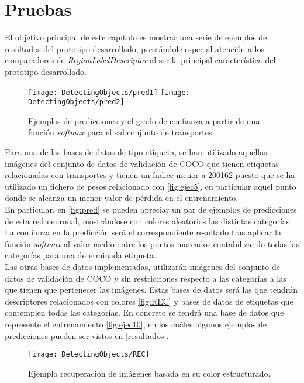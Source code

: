 \chapter{Pruebas}
El objetivo principal de este capítulo es mostrar una serie de ejemplos de resultados del prototipo desarrollado, prestándole especial atención a los comparadores de \emph{RegionLabelDescriptor} al ser la principal característica del prototipo desarrollado.\\

\begin{figure}[htpb]
  \centering
  \texttt{[image: DetectingObjects/pred1]}
  \texttt{[image: DetectingObjects/pred2]}
  \caption{Ejemplos de predicciones y el grado de confianza a partir de una función \emph{softmax} para el subconjunto de transportes.}
  \label{fig:pred}
\end{figure}

Para una de las bases de datos de tipo etiqueta, se han utilizado aquellas imágenes del conjunto de datos de validación de COCO \cite{COCO} que tienen etiquetas relacionadas con transportes y tienen un índice menor a 200162 puesto que se ha utilizado un fichero de pesos relacionado con \autoref{fig:ejec5}, en particular aquel punto donde se alcanza un menor valor de pérdida en el entrenamiento.\\

En particular, en \autoref{fig:pred} se pueden apreciar un par de ejemplos de predicciones de esta red neuronal, mostrándose con colores aleatorios las distintas categorías. La confianza en la predicción será el correspondiente resultado tras aplicar la función \emph{softmax} al valor medio entre los puntos marcados contabilizando todas las categorías para una determinada etiqueta.\\

Las otras bases de datos implementadas, utilizarán imágenes del conjunto de datos de validación de COCO \cite{COCO} y sin restricciones respecto a las categorías a las que tienen que pertenecer las imágenes. Estas bases de datos será las que tendrán descriptores relacionados con colores \autoref{fig:REC} y bases de datos de etiquetas que contemplen todas las categorías. En concreto se tendrá una base de datos que represente el entrenamiento \autoref{fig:ejec10}, en los cuáles algunos ejemplos de predicciones pueden ser vistos en \autoref{resultados}.\\

\begin{figure}[htpb]
  \centering
  \texttt{[image: DetectingObjects/REC]}
  \caption{Ejemplo recuperación de imágenes basada en su color estructurado.}
  \label{fig:REC}
\end{figure}

